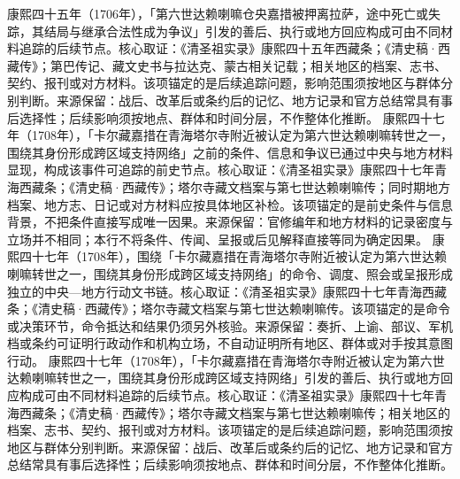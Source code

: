 康熙四十五年（1706年），「第六世达赖喇嘛仓央嘉措被押离拉萨，途中死亡或失踪，其结局与继承合法性成为争议」引发的善后、执行或地方回应构成可由不同材料追踪的后续节点。核心取证：《清圣祖实录》康熙四十五年西藏条；《清史稿·西藏传》；第巴传记、藏文史书与拉达克、蒙古相关记载；相关地区的档案、志书、契约、报刊或对方材料。该项锚定的是后续追踪问题，影响范围须按地区与群体分别判断。来源保留：战后、改革后或条约后的记忆、地方记录和官方总结常具有事后选择性；后续影响须按地点、群体和时间分层，不作整体化推断。
康熙四十七年（1708年），「卡尔藏嘉措在青海塔尔寺附近被认定为第六世达赖喇嘛转世之一，围绕其身份形成跨区域支持网络」之前的条件、信息和争议已通过中央与地方材料显现，构成该事件可追踪的前史节点。核心取证：《清圣祖实录》康熙四十七年青海西藏条；《清史稿·西藏传》；塔尔寺藏文档案与第七世达赖喇嘛传；同时期地方档案、地方志、日记或对方材料应按具体地区补检。该项锚定的是前史条件与信息背景，不把条件直接写成唯一因果。来源保留：官修编年和地方材料的记录密度与立场并不相同；本行不将条件、传闻、呈报或后见解释直接等同为确定因果。
康熙四十七年（1708年），围绕「卡尔藏嘉措在青海塔尔寺附近被认定为第六世达赖喇嘛转世之一，围绕其身份形成跨区域支持网络」的命令、调度、照会或呈报形成独立的中央—地方行动文书链。核心取证：《清圣祖实录》康熙四十七年青海西藏条；《清史稿·西藏传》；塔尔寺藏文档案与第七世达赖喇嘛传。该项锚定的是命令或决策环节，命令抵达和结果仍须另外核验。来源保留：奏折、上谕、部议、军机档或条约可证明行政动作和机构立场，不自动证明所有地区、群体或对手按其意图行动。
康熙四十七年（1708年），「卡尔藏嘉措在青海塔尔寺附近被认定为第六世达赖喇嘛转世之一，围绕其身份形成跨区域支持网络」引发的善后、执行或地方回应构成可由不同材料追踪的后续节点。核心取证：《清圣祖实录》康熙四十七年青海西藏条；《清史稿·西藏传》；塔尔寺藏文档案与第七世达赖喇嘛传；相关地区的档案、志书、契约、报刊或对方材料。该项锚定的是后续追踪问题，影响范围须按地区与群体分别判断。来源保留：战后、改革后或条约后的记忆、地方记录和官方总结常具有事后选择性；后续影响须按地点、群体和时间分层，不作整体化推断。
